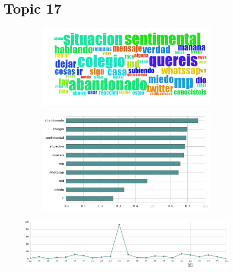 \section{Topic 17}

\begin{figure}[htbp!]
    \centering
    \begin{subfigure}[b]{0.49\textwidth}
        \includegraphics[width=\textwidth]{twitter_all/report_images/topic-17-wordcloud.jpg}
    \end{subfigure}
    \begin{subfigure}[b]{0.49\textwidth}
        \includegraphics[width=\textwidth]{twitter_all/report_images/topic-17-terms.jpg}
    \end{subfigure}
\end{figure}

\begin{figure}[htbp!]
    \centering
    \includegraphics[width=\textwidth]{twitter_all/report_images/topic-17-timeseries.jpg}
\end{figure}

